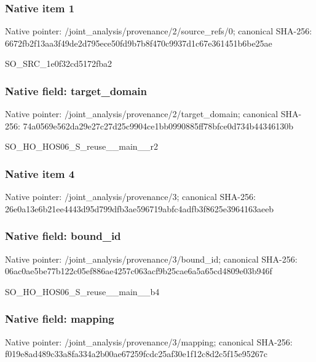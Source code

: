 \documentclass[10pt,a4paper]{article}
\begin{document}
\subsubsection{Native item 1}
Native pointer: /joint\_\allowbreak{}analysis/provenance/2/source\_\allowbreak{}refs/0; canonical SHA-256: 6672fb2f13aa3f49de2d795ece50fd9b7b8f470c9937d1c67e361451b6be25ae

\begingroup\raggedright\sloppy SO\_\allowbreak{}SRC\_\allowbreak{}1e0f32cd5172fba2\par\endgroup

\subsubsection{Native field: target\_\allowbreak{}domain}
Native pointer: /joint\_\allowbreak{}analysis/provenance/2/target\_\allowbreak{}domain; canonical SHA-256: 74a0569e562da29e27c27d25c9904ce1bb0990885ff78bfce0d734b44346130b

\begingroup\raggedright\sloppy SO\_\allowbreak{}HO\_\allowbreak{}HOS06\_\allowbreak{}S\_\allowbreak{}reuse\_\allowbreak{}\_\allowbreak{}main\_\allowbreak{}\_\allowbreak{}r2\par\endgroup

\subsubsection{Native item 4}
Native pointer: /joint\_\allowbreak{}analysis/provenance/3; canonical SHA-256: 26e0a13e6b21ee4443d95d799dfb3ae596719abfc4adfb3f8625e3964163aeeb

\subsubsection{Native field: bound\_\allowbreak{}id}
Native pointer: /joint\_\allowbreak{}analysis/provenance/3/bound\_\allowbreak{}id; canonical SHA-256: 06ac0ae5be77b122c05ef886ae4257c063acf9b25cae6a5a65cd4809e03b946f

\begingroup\raggedright\sloppy SO\_\allowbreak{}HO\_\allowbreak{}HOS06\_\allowbreak{}S\_\allowbreak{}reuse\_\allowbreak{}\_\allowbreak{}main\_\allowbreak{}\_\allowbreak{}b4\par\endgroup

\subsubsection{Native field: mapping}
Native pointer: /joint\_\allowbreak{}analysis/provenance/3/mapping; canonical SHA-256: f019e8ad489c33a8fa334a2b00ae67259fcdc25af30e1f12c8d2c5f15e95267c
\end{document}
